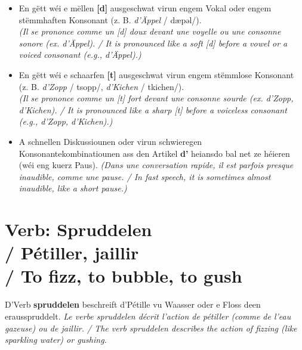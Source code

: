 \begin{itemize}
    \item En gëtt wéi e mëllen \textbf{[d]} ausgeschwat virun engem Vokal oder engem stëmmhaften Konsonant (z. B. \textit{d'Äppel} / dæpəl/). \\ \textit{(Il se prononce comme un [d] doux devant une voyelle ou une consonne sonore (ex. d'Äppel). / It is pronounced like a soft [d] before a vowel or a voiced consonant (e.g., d'Äppel).)}
    \item En gëtt wéi e schaarfen \textbf{[t]} ausgeschwat virun engem stëmmlose Konsonant (z. B. \textit{d'Zopp} / tsopp/, \textit{d'Kichen} / tkichen/). \\ \textit{(Il se prononce comme un [t] fort devant une consonne sourde (ex. d'Zopp, d'Kichen). / It is pronounced like a sharp [t] before a voiceless consonant (e.g., d'Zopp, d'Kichen).)}
    \item A schnellen Diskussiounen oder virun schwieregen Konsonantekombinatiounen ass den Artikel \textbf{d'} heiansdo bal net ze héieren (wéi eng kuerz Paus). \textit{(Dans une conversation rapide, il est parfois presque inaudible, comme une pause. / In fast speech, it is sometimes almost inaudible, like a short pause.)}
\end{itemize}

\vspace{1cm}

\section[Verb: Spruddelen / Verbe / Verb]{Verb: Spruddelen \\/ Pétiller, jaillir \\/ To fizz, to bubble, to gush}

D'Verb \textbf{spruddelen} beschreift d'Pétille vu Waasser oder e Floss deen erausspruddelt. \textit{Le verbe spruddelen décrit l'action de pétiller (comme de l'eau gazeuse) ou de jaillir. / The verb spruddelen describes the action of fizzing (like sparkling water) or gushing.}

\vspace{0.5em}

